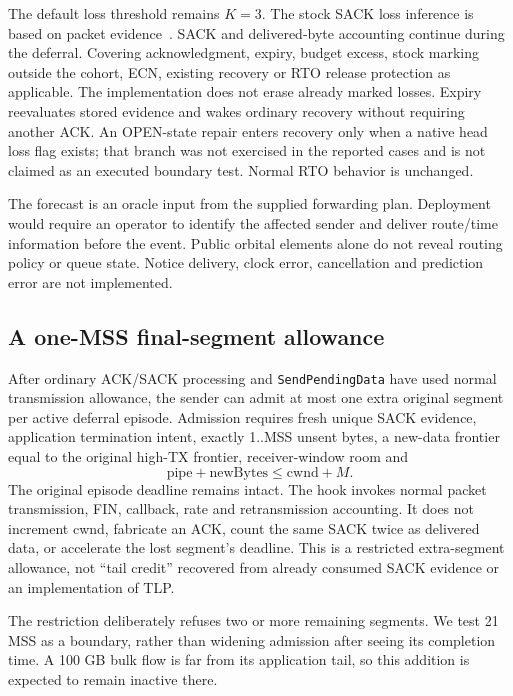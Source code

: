 \documentclass[conference]{IEEEtran}
\begin{document}
The default loss threshold remains $K=3$. The stock SACK loss inference is
based on packet evidence~\cite{sack}. SACK and delivered-byte
accounting continue during the deferral. Covering acknowledgment, expiry,
budget excess, stock marking outside the cohort, ECN, existing recovery
or RTO release protection as applicable. The implementation does not
erase already marked losses. Expiry reevaluates stored evidence and
wakes ordinary recovery without requiring another ACK. An OPEN-state
repair enters recovery only when a native head loss flag exists; that
branch was not exercised in the reported cases and is not claimed as an
executed boundary test. Normal RTO behavior is unchanged.

The forecast is an oracle input from the supplied forwarding plan.
Deployment would require an operator to identify the affected sender and
deliver route/time information before the event. Public orbital elements
alone do not reveal routing policy or queue state. Notice delivery,
clock error, cancellation and prediction error are not implemented.

\subsection{A one-MSS final-segment allowance}
After ordinary ACK/SACK processing and \texttt{SendPendingData} have used
normal transmission allowance, the sender can admit at most one extra
original segment per active deferral episode. Admission requires fresh
unique SACK evidence, application termination intent, exactly 1..MSS
unsent bytes, a new-data frontier equal to the original high-TX frontier,
receiver-window room and
\begin{equation}
 \mathrm{pipe}+\mathrm{newBytes}\le\mathrm{cwnd}+M.
\end{equation}
The original episode deadline remains intact. The hook invokes normal
packet transmission, FIN, callback, rate and retransmission accounting.
It does not increment cwnd, fabricate an ACK, count the same SACK twice
as delivered data, or accelerate the lost segment's deadline. This is a
restricted extra-segment allowance, not ``tail credit'' recovered from
already consumed SACK evidence or an implementation of TLP.

The restriction deliberately refuses two or more remaining segments.
We test 21 MSS as a boundary, rather than widening admission after seeing
its completion time. A 100 GB bulk flow is far from its application tail,
so this addition is expected to remain inactive there.
\end{document}
